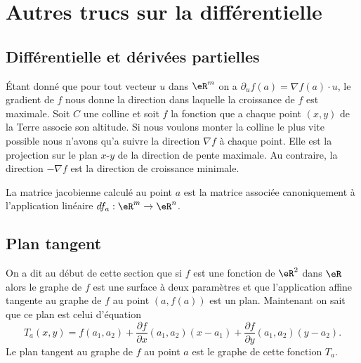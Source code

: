 \section{Autres trucs sur la différentielle}

\subsection{Différentielle et dérivées partielles}

Étant donné que pour tout vecteur $u$ dans $\eR^m$ on a $\partial_uf(a)=\nabla f(a)\cdot u$, le gradient de $f$ nous donne la direction dans laquelle la croissance de $f$ est maximale. Soit $C$ une colline et soit $f$ la fonction que a chaque point $(x,y)$ de la Terre associe son altitude. Si nous voulons monter la colline le plus vite possible nous n'avons qu'a suivre la direction $\nabla f$ à chaque point. Elle est la projection sur le plan $x$-$y$ de la direction de pente maximale. Au contraire, la direction $-\nabla f$ est la direction de croissance minimale.

La matrice jacobienne calculé au point $a$ est la matrice associée canoniquement à l'application linéaire $df_a:\eR^m\to\eR^n$.

\subsection{Plan tangent}

On a dit au début de cette section que si $f$ est une fonction de $\eR^2$ dans $\eR$ alors le graphe de $f$ est une surface à deux paramètres et que l'application affine tangente au graphe de $f$ au point $(a, f(a))$ est un plan. Maintenant on sait que ce plan est celui d'équation
\begin{equation}
	T_a(x,y)=f(a_1,a_2)+\frac{ \partial f }{ \partial x }(a_1,a_2)(x-a_1)+\frac{ \partial f }{ \partial y }(a_1,a_2)(y-a_2).
\end{equation}
Le plan tangent au graphe de $f$ au point $a$ est le graphe de cette fonction $T_a$.

